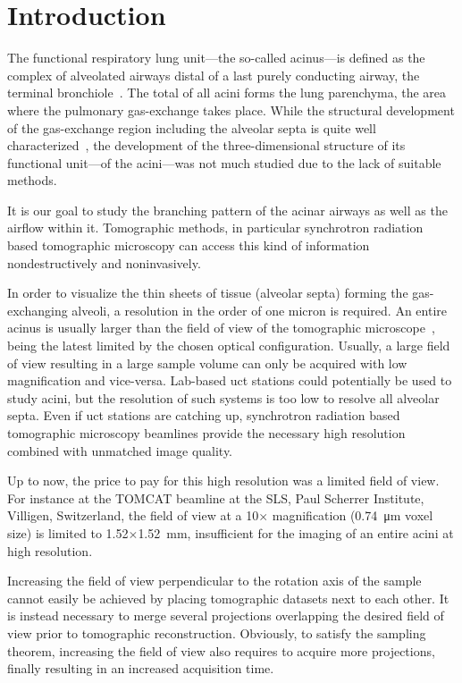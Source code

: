 \section{Introduction}
The functional respiratory lung unit---the so-called acinus---is defined as the complex of alveolated airways distal of a last purely conducting airway, the terminal bronchiole~\cite{Rodriguez1987}. The total of all acini forms the lung parenchyma, the area where the pulmonary gas-exchange takes place. While the structural development of the gas-exchange region including the alveolar septa is quite well characterized~\cite{Schittny2007a,Schittny2008,Mund2008}, the development of the three-dimensional structure of its functional unit---of the acini---was not much studied due to the lack of suitable methods.

It is our goal to study the branching pattern of the acinar airways as well as the airflow within it. Tomographic methods, in particular synchrotron radiation based tomographic microscopy can access this kind of information nondestructively and noninvasively.

In order to visualize the thin sheets of tissue (alveolar septa) forming the gas-exchanging alveoli, a resolution in the order of one micron is required. An entire acinus is usually larger than the field of view of the tomographic microscope~\cite{Rodriguez1987,Weibel2009}, being the latest limited by the chosen optical configuration. Usually, a large field of view resulting in a large sample volume can only be acquired with low magnification and vice-versa. Lab-based \acf{uct} stations could potentially be used to study acini, but the resolution of such systems is too low to resolve all alveolar septa. Even if \ac{uct} stations are catching up, synchrotron radiation based tomographic microscopy beamlines provide the necessary high resolution combined with unmatched image quality.

Up to now, the price to pay for this high resolution was a limited field of view. For instance at the \ac{TOMCAT} beamline \cite{Stampanoni2007} at the \acl{SLS}, Paul Scherrer Institute, Villigen, Switzerland, the field of view at a 10$\times$ magnification (\SI{0.74}{\micro\meter} voxel size) is limited to 1.52$\times$\SI{1.52}{\milli\meter}, insufficient for the imaging of an entire acini at high resolution.

Increasing the field of view perpendicular to the rotation axis of the sample cannot easily be achieved by placing tomographic datasets next to each other. It is instead necessary to merge several projections overlapping the desired field of view prior to tomographic reconstruction. Obviously, to satisfy the sampling theorem, increasing the field of view also requires to acquire more projections, finally resulting in an increased acquisition time.

